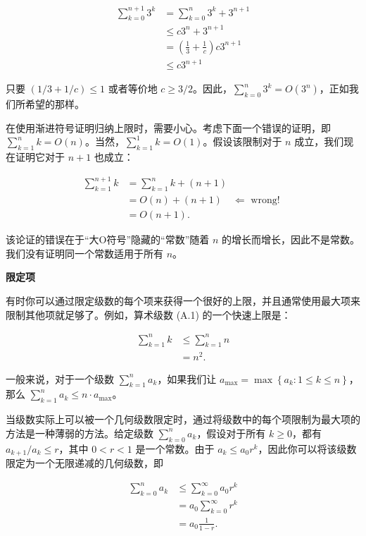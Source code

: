 \documentclass[lang=cn,newtx,10pt,scheme=chinese]{elegantbook}
\begin{document}
$$
\begin{aligned}
\sum_{k=0}^{n+1} 3^k & =\sum_{k=0}^n 3^k+3^{n+1} \\
& \leq c 3^n+3^{n+1} \\
& =\left(\frac{1}{3}+\frac{1}{c}\right) c 3^{n+1} \\
& \leq c 3^{n+1}
\end{aligned}
$$

只要 $(1 / 3+1 / c) \leq 1$ 或者等价地 $c \geq 3 / 2$。因此，$\sum_{k=0}^n 3^k=O\left(3^n\right)$，正如我们所希望的那样。

在使用渐进符号证明归纳上限时，需要小心。考虑下面一个错误的证明，即 $\sum_{k=1}^n k=O(n)$。当然，$\sum_{k=1}^1 k=O(1)$。假设该限制对于 $n$ 成立，我们现在证明它对于 $n+1$ 也成立：

$$
\begin{aligned}
\sum_{k=1}^{n+1} k & =\sum_{k=1}^n k+(n+1) \\
& =O(n)+(n+1) \quad \Longleftarrow \text { wrong! } \\
& =O(n+1) .
\end{aligned}
$$

该论证的错误在于“大O符号”隐藏的“常数”随着 $n$ 的增长而增长，因此不是常数。我们没有证明同一个常数适用于所有 $n$。

\textbf{限定项}

有时你可以通过限定级数的每个项来获得一个很好的上限，并且通常使用最大项来限制其他项就足够了。例如，算术级数 (A.1) 的一个快速上限是：

$$
\begin{aligned}
\sum_{k=1}^n k & \leq \sum_{k=1}^n n \\
& =n^2 .
\end{aligned}
$$

一般来说，对于一个级数 $\sum_{k=1}^n a_k$，如果我们让 $a_{\max }=\max \left\{a_k: 1 \leq k \leq n\right\}$，那么 $\sum_{k=1}^n a_k \leq n \cdot a_{\max }$。

当级数实际上可以被一个几何级数限定时，通过将级数中的每个项限制为最大项的方法是一种薄弱的方法。给定级数 $\sum_{k=0}^n a_k$，假设对于所有 $k \geq 0$，都有 $a_{k+1} / a_k \leq r$，其中 $0<r<1$ 是一个常数。由于 $a_k \leq a_0 r^k$，因此你可以将该级数限定为一个无限递减的几何级数，即

$$
\begin{aligned}
\sum_{k=0}^n a_k & \leq \sum_{k=0}^{\infty} a_0 r^k \\
& =a_0 \sum_{k=0}^{\infty} r^k \\
& =a_0 \frac{1}{1-r} .
\end{aligned}
$$
\end{document}
